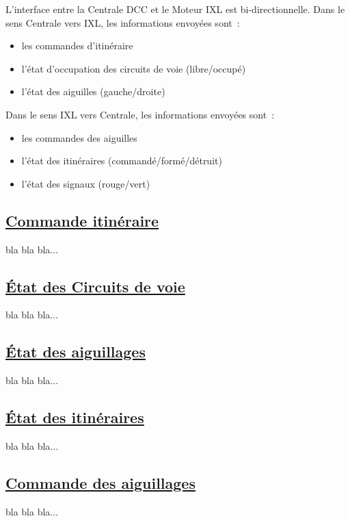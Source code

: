 L'interface entre la Centrale DCC et le Moteur IXL est bi-directionnelle. 
Dans le sens Centrale vers IXL, les informations envoyées sont~:
\begin{itemize}
\item les commandes d'itinéraire
\item l'état d'occupation des circuits de voie (libre/occupé)
\item l'état des aiguilles (gauche/droite)
\end{itemize}

Dans le sens IXL vers Centrale, les informations envoyées sont~:
\begin{itemize}
\item les commandes des aiguilles
\item l'état des itinéraires (commandé/formé/détruit)
\item l'état des signaux (rouge/vert)
\end{itemize}

\subsection{\underline{Commande itinéraire}}
\label{sec:ixl_iti}

bla bla bla...

\subsection{\underline{\'Etat des Circuits de voie}}
\label{sec:ixl_cdv}

bla bla bla...

\subsection{\underline{\'Etat des aiguillages}}
\label{sec:ixl_aig}

bla bla bla...

\subsection{\underline{\'Etat des itinéraires}}
\label{sec:st_iti}

bla bla bla...


\subsection{\underline{Commande des aiguillages}}
\label{sec:cmd_aig}

bla bla bla...

